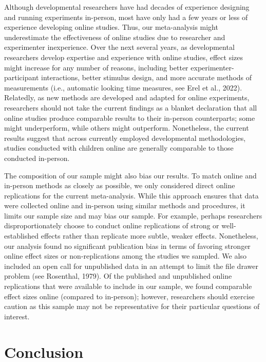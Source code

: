 \documentclass[
  man,floatsintext]{apa6}
\begin{document}
Although developmental researchers have had decades of experience designing and running experiments in-person, most have only had a few years or less of experience developing online studies. Thus, our meta-analysis might underestimate the effectiveness of online studies due to researcher and experimenter inexperience. Over the next several years, as developmental researchers develop expertise and experience with online studies, effect sizes might increase for any number of reasons, including better experimenter-participant interactions, better stimulus design, and more accurate methods of measurements (i.e., automatic looking time measures, see Erel et al., 2022). Relatedly, as new methods are developed and adapted for online experiments, researchers should not take the current findings as a blanket declaration that all online studies produce comparable results to their in-person counterparts; some might underperform, while others might outperform. Nonetheless, the current results suggest that across currently employed developmental methodologies, studies conducted with children online are generally comparable to those conducted in-person.

The composition of our sample might also bias our results. To match online and in-person methods as closely as possible, we only considered direct online replications for the current meta-analysis. While this approach ensures that data were collected online and in-person using similar methods and procedures, it limits our sample size and may bias our sample. For example, perhaps researchers disproportionately choose to conduct online replications of strong or well-established effects rather than replicate more subtle, weaker effects. Nonetheless, our analysis found no significant publication bias in terms of favoring stronger online effect sizes or non-replications among the studies we sampled. We also included an open call for unpublished data in an attempt to limit the file drawer problem (see Rosenthal, 1979). Of the published and unpublished online replications that were available to include in our sample, we found comparable effect sizes online (compared to in-person); however, researchers should exercise caution as this sample may not be representative for their particular questions of interest.

\hypertarget{conclusion}{%
\section{Conclusion}\label{conclusion}}
\end{document}

